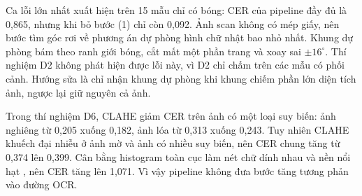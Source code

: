 Ca lỗi lớn nhất xuất hiện trên 15 mẫu chỉ có bóng: CER của pipeline đầy đủ là 0,865, nhưng khi bỏ bước (1) chỉ còn 0,092.
Ảnh scan không có mép giấy, nên bước tìm góc rơi về phương án dự phòng hình chữ nhật bao nhỏ nhất.
Khung dự phòng bám theo ranh giới bóng, cắt mất một phần trang và xoay sai $\pm16^\circ$.
Thí nghiệm D2 không phát hiện được lỗi này, vì D2 chỉ chấm trên các mẫu có phối cảnh.
Hướng sửa là chỉ nhận khung dự phòng khi khung chiếm phần lớn diện tích ảnh, ngược lại giữ nguyên cả ảnh.

Trong thí nghiệm D6, CLAHE giảm CER trên ảnh có một loại suy biến: ảnh nghiêng từ 0,205 xuống 0,182, ảnh lóa từ 0,313 xuống 0,243.
Tuy nhiên CLAHE khuếch đại nhiễu ở ảnh mờ và ảnh có nhiều suy biến, nên CER chung tăng từ 0,374 lên 0,399.
Cân bằng histogram toàn cục làm nét chữ dính nhau và nền nổi hạt , nên CER tăng lên 1,071.
Vì vậy pipeline không đưa bước tăng tương phản vào đường OCR.
